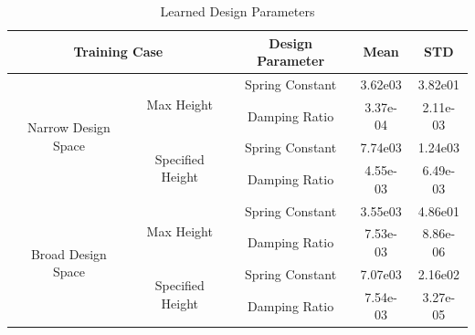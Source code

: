 \begin{table}[tb!]
\caption{Learned Design Parameters}
\vspace{-4mm}
\label{tab:learned_design_params}
\begin{center}
\begin{tabular}{c c c c c}
\multicolumn{2}{c}{\textbf{Training Case}}                                                                 & \textbf{Design Parameter} & \textbf{Mean}     & \textbf{STD}      \\
\hline
\hline
\multirow{4}{*}{\centering Narrow Design Space}         & \multirow{2}{*}{\centering Max Height}             & Spring Constant           & 3.62e03           & 3.82e01           \\
                                                        &                                                    & Damping Ratio             & 3.37e-04          & 2.11e-03          \\
                                                        & \multirow{2}{*}{\centering Specified Height}       & Spring Constant           & 7.74e03           & 1.24e03           \\
                                                        &                                                    & Damping Ratio             & 4.55e-03          & 6.49e-03          \\
\multirow{4}{*}{\centering Broad Design Space}          & \multirow{2}{*}{\centering Max Height}             & Spring Constant           & 3.55e03           & 4.86e01           \\
                                                        &                                                    & Damping Ratio             & 7.53e-03          & 8.86e-06          \\
                                                        & \multirow{2}{*}{\centering Specified Height}       & Spring Constant           & 7.07e03           & 2.16e02           \\
                                                        &                                                    & Damping Ratio             & 7.54e-03          & 3.27e-05          \\
\hline
\hline
\end{tabular}
\end{center}
\end{table}

